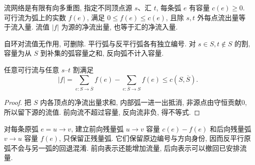 \label{ch:flow}
\begin{definition}
流网络是有限有向多重图, 指定不同顶点源 $s$、汇 $t$, 每条弧 $e$ 有容量 $c(e)\ge0$. 可行流为弧上的实数 $f(e)$, 满足 $0\le f(e)\le c(e)$, 且除 $s,t$ 外每点流出量等于流入量. 流值 $|f|$ 为源的净流出量, 也等于汇的净流入量.
\end{definition}
自环对流值无作用, 可删除. 平行弧与反平行弧各有独立编号. 对 $s\in S,t\notin S$ 的割, 容量为从 $S$ 到补集的弧容量之和, 反向弧不计入容量.
\begin{lemma}[弱对偶]\label{lem:flowweak}
任意可行流与任意 $s$--$t$ 割满足
\[
|f|=\sum_{e:S\to\overline S}f(e)-\sum_{e:\overline S\to S}f(e)\le c(S,\overline S).
\]
\end{lemma}
\begin{proof}
把 $S$ 内各顶点的净流出量求和, 内部弧一进一出抵消, 非源点由守恒贡献0, 所以留下源的流值. 前向流不超过容量, 反向流非负, 得不等式.
\end{proof}
对每条原弧 $e=u\to v$, 建立前向残量弧 $u\to v$ 容量 $c(e)-f(e)$ 和后向残量弧 $v\to u$ 容量 $f(e)$, 只保留正残量弧. 它们保留原边编号与方向身份, 因而反平行原弧不会与另一弧的回退混淆. 前向表示还能增加流量, 后向表示可以撤回已安排流量.

